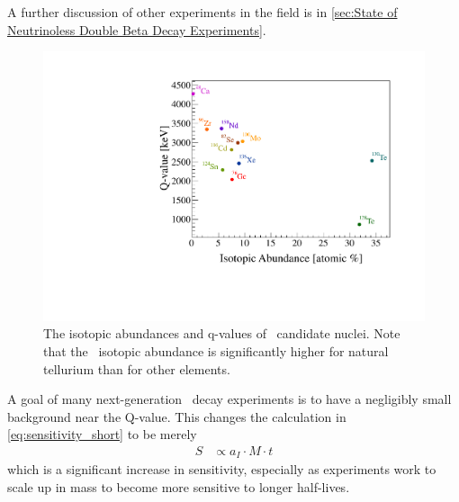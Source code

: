 A further discussion of other experiments in the field is in \autoref{sec:State of Neutrinoless Double Beta Decay Experiments}.
\begin{figure}[htbp]
    \centering
    \includegraphics[width=0.7\linewidth]{Figures/q_vs_ia-color.pdf}
    \caption[The isotopic abundances and q-values of \zeronubb~candidate nuclei.]
    {The isotopic abundances and q-values of \zeronubb~candidate nuclei.
    Note that the \teonethirty~isotopic abundance is significantly higher for natural tellurium than for other elements.}
    \label{fig:q_vs_ia-color}
\end{figure}
A goal of many next-generation \zeronubb~decay experiments is to have a negligibly small background near the Q-value.
This changes the calculation in \autoref{eq:sensitivity_short} to be merely
\begin{align}
    S &\propto a_I \cdot M \cdot t
\end{align}
which is a significant increase in sensitivity, especially as experiments work to scale up in mass to become more sensitive to longer half-lives.
